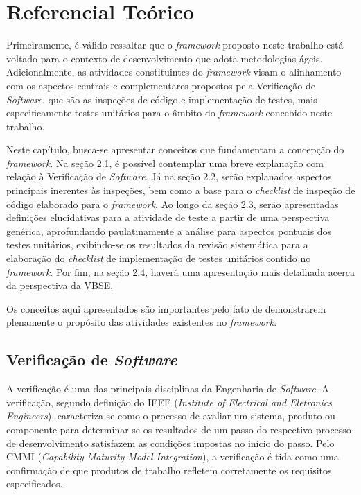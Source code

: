 \chapter{Referencial Teórico}

Primeiramente, é válido ressaltar que o \textit{framework} proposto neste trabalho está voltado para o contexto de desenvolvimento que adota metodologias ágeis. Adicionalmente, as atividades constituintes do \textit{framework} visam o alinhamento com os aspectos centrais e complementares propostos pela Verificação de \textit{Software}, que são as inspeções de código e implementação de testes, mais especificamente testes unitários para o âmbito do \textit{framework} concebido neste trabalho.

Neste capítulo, busca-se apresentar conceitos que fundamentam a concepção do \textit{framework}. Na seção 2.1, é possível contemplar uma breve explanação com relação à Verificação de \textit{Software}. Já na seção 2.2, serão explanados aspectos principais inerentes às inspeções, bem como a base para o \textit{checklist} de inspeção de código elaborado para o \textit{framework}. Ao longo da seção 2.3, serão apresentadas definições elucidativas para a atividade de teste a partir de uma perspectiva genérica, aprofundando paulatinamente a análise para aspectos pontuais dos testes unitários, exibindo-se os resultados da revisão sistemática para a elaboração do \textit{checklist} de implementação de testes unitários contido no \textit{framework}. Por fim, na seção 2.4, haverá uma apresentação mais detalhada acerca da perspectiva da VBSE.

Os conceitos aqui apresentados são importantes pelo fato de demonstrarem plenamente o propósito das atividades existentes no \textit{framework}.

\section{Verificação de \textit{Software}}

A verificação é uma das principais disciplinas da Engenharia de \textit{Software}. A verificação, segundo definição do IEEE (\textit{Institute of Electrical and Eletronics Engineers}), caracteriza-se como o processo de avaliar um sistema, produto ou componente para determinar se os resultados de um passo do respectivo processo de desenvolvimento satisfazem as condições impostas no início do passo. Pelo CMMI (\textit{Capability Maturity Model Integration}), a verificação é tida como uma confirmação de que produtos de trabalho refletem corretamente os requisitos especificados.

